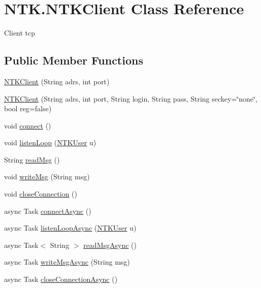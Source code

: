 \hypertarget{class_n_t_k_1_1_n_t_k_client}{}\section{N\+T\+K.\+N\+T\+K\+Client Class Reference}
\label{class_n_t_k_1_1_n_t_k_client}


Client tcp  


\subsection*{Public Member Functions}
\begin{DoxyCompactItemize}
\item 
\mbox{\hyperlink{class_n_t_k_1_1_n_t_k_client_ae6350ba62e1ba3e2e5af88dc629897c8}{N\+T\+K\+Client}} (String adrs, int port)
\item 
\mbox{\hyperlink{class_n_t_k_1_1_n_t_k_client_ab8d8eff12fc192d9a9c3aca7aa62b059}{N\+T\+K\+Client}} (String adrs, int port, String login, String pass, String seckey=\char`\"{}none\char`\"{}, bool reg=false)
\item 
void \mbox{\hyperlink{class_n_t_k_1_1_n_t_k_client_a79e34c6bb05c45c1d1951e41d4dd3796}{connect}} ()
\item 
void \mbox{\hyperlink{class_n_t_k_1_1_n_t_k_client_ad5b84d00ba712a8d999dacaa53931ccd}{listen\+Loop}} (\mbox{\hyperlink{class_n_t_k_1_1_n_t_k_user}{N\+T\+K\+User}} u)
\item 
String \mbox{\hyperlink{class_n_t_k_1_1_n_t_k_client_a7abc94410754bf96fc8ce1add683bc23}{read\+Msg}} ()
\item 
void \mbox{\hyperlink{class_n_t_k_1_1_n_t_k_client_ab1c347a28f74f6e249da9e703c0d335b}{write\+Msg}} (String msg)
\item 
void \mbox{\hyperlink{class_n_t_k_1_1_n_t_k_client_af2e8d9543ab2e7f1c9d8029f39c65cef}{close\+Connection}} ()
\item 
async Task \mbox{\hyperlink{class_n_t_k_1_1_n_t_k_client_ab0b12214618121588a44c4014b9c3744}{connect\+Async}} ()
\item 
async Task \mbox{\hyperlink{class_n_t_k_1_1_n_t_k_client_ade7773aa755ddca954a07efc34f180d6}{listen\+Loop\+Async}} (\mbox{\hyperlink{class_n_t_k_1_1_n_t_k_user}{N\+T\+K\+User}} u)
\item 
async Task$<$ String $>$ \mbox{\hyperlink{class_n_t_k_1_1_n_t_k_client_a45fa58eea4aab5dd2fc84c6dfd5ccc45}{read\+Msg\+Async}} ()
\item 
async Task \mbox{\hyperlink{class_n_t_k_1_1_n_t_k_client_aed6b5427a784b45ba4b08e290a8f1800}{write\+Msg\+Async}} (String msg)
\item 
async Task \mbox{\hyperlink{class_n_t_k_1_1_n_t_k_client_a419eea19ebbce59e3b0a8ddd798be191}{close\+Connection\+Async}} ()
\end{DoxyCompactItemize}

